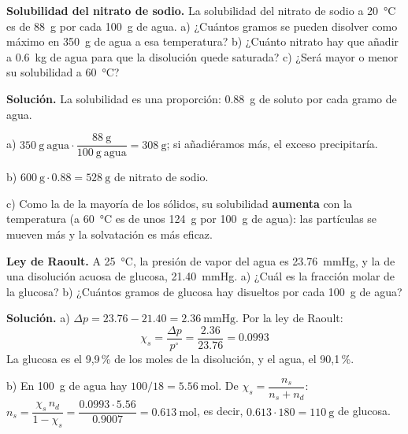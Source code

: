 \begin{example}
    \textbf{Solubilidad del nitrato de sodio.} La solubilidad del nitrato de sodio a \qty{20}{\degreeCelsius} es de
    \qty{88}{\gram} por cada \qty{100}{\gram} de agua. a) ¿Cuántos gramos se pueden disolver como máximo en \qty{350}{\gram} de
    agua a esa temperatura? b) ¿Cuánto nitrato hay que añadir a \qty{0.6}{\kilo\gram} de agua para que la disolución quede
    saturada? c) ¿Será mayor o menor su solubilidad a \qty{60}{\degreeCelsius}?

    \textbf{Solución.} La solubilidad es una proporción: \qty{0.88}{\gram} de soluto por cada gramo de agua.

    a) \(\qty{350}{\gram}\ \text{agua} \cdot \dfrac{\qty{88}{\gram}}{\qty{100}{\gram}\ \text{agua}} = \qty{308}{\gram}\); si añadiéramos más,
    el exceso precipitaría.

    b) \(\qty{600}{\gram} \cdot \num{0.88} = \qty{528}{\gram}\) de nitrato de sodio.

    c) Como la de la mayoría de los sólidos, su solubilidad \textbf{aumenta} con la temperatura (a \qty{60}{\degreeCelsius} es de
    unos \qty{124}{\gram} por \qty{100}{\gram} de agua): las partículas se mueven más y la solvatación es más eficaz.
\end{example}

\begin{example}
    \textbf{Ley de Raoult.} A \qty{25}{\degreeCelsius}, la presión de vapor del agua es \qty{23.76}{\mmHg}, y la de una
    disolución acuosa de glucosa, \qty{21.40}{\mmHg}. a) ¿Cuál es la fracción molar de la glucosa? b) ¿Cuántos gramos de glucosa
    hay disueltos por cada \qty{100}{\gram} de agua?

    \textbf{Solución.} a) \(\Delta p = \num{23.76} - \num{21.40} = \qty{2.36}{\mmHg}\). Por la ley de Raoult:
    \[ \chi_s = \frac{\Delta p}{p^{\circ}} = \frac{\num{2.36}}{\num{23.76}} = \num{0.0993} \]
    La glucosa es el 9,9\,\% de los moles de la disolución, y el agua, el 90,1\,\%.

    b) En \qty{100}{\gram} de agua hay \(100/18 = \qty{5.56}{\mol}\). De \(\chi_s = \dfrac{n_s}{n_s + n_d}\):
    \(n_s = \dfrac{\chi_s \, n_d}{1 - \chi_s} = \dfrac{\num{0.0993} \cdot \num{5.56}}{\num{0.9007}} = \qty{0.613}{\mol}\), es decir,
    \(\num{0.613} \cdot 180 = \qty{110}{\gram}\) de glucosa.
\end{example}


